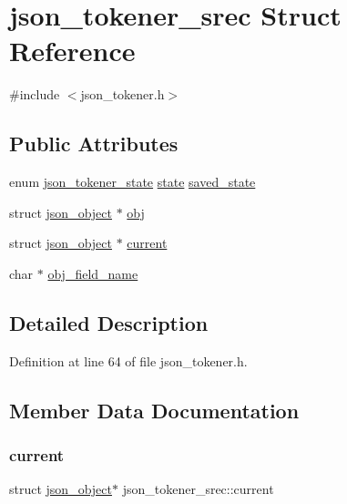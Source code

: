 \hypertarget{structjson__tokener__srec}{}\section{json\+\_\+tokener\+\_\+srec Struct Reference}
\label{structjson__tokener__srec}


{\ttfamily \#include $<$json\+\_\+tokener.\+h$>$}

\subsection*{Public Attributes}
\begin{DoxyCompactItemize}
\item 
enum \hyperlink{json__tokener_8h_af026dec71e4548e6200eb2f902f1c4e2}{json\+\_\+tokener\+\_\+state} \hyperlink{json__tokener_8c_a17ba9d3d3f420182822febf73adca0a4}{state} \hyperlink{structjson__tokener__srec_a868b9912dbb1e4813a630c944f522d48}{saved\+\_\+state}
\item 
struct \hyperlink{structjson__object}{json\+\_\+object} $\ast$ \hyperlink{structjson__tokener__srec_ad2bb71affec1da5ba1d9952c3bf2c12a}{obj}
\item 
struct \hyperlink{structjson__object}{json\+\_\+object} $\ast$ \hyperlink{structjson__tokener__srec_a466f192f920368a5a6375aeba1e2757f}{current}
\item 
char $\ast$ \hyperlink{structjson__tokener__srec_a99551c172e97ac2e7a3849a50b4f51ca}{obj\+\_\+field\+\_\+name}
\end{DoxyCompactItemize}


\subsection{Detailed Description}


Definition at line 64 of file json\+\_\+tokener.\+h.



\subsection{Member Data Documentation}
\mbox{\label{structjson__tokener__srec_a466f192f920368a5a6375aeba1e2757f}} 
\subsubsection{\texorpdfstring{current}{current}}
{\footnotesize\ttfamily struct \hyperlink{structjson__object}{json\+\_\+object}$\ast$ json\+\_\+tokener\+\_\+srec\+::current}



